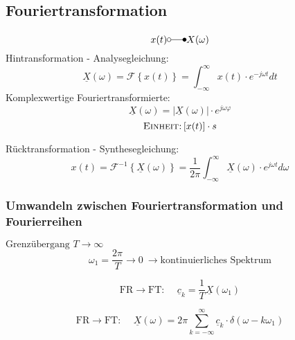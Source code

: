 \subsection{Fouriertransformation}
\begin{mdframed}[style=exercise]
    \[
        x(t) \laplace X(\omega)
    \]
    Hintransformation - Analysegleichung:
    \[
        \underline{X}(\omega)=\mathcal{F}\left\{ x(t) \right\} = \int_{-\infty}^{\infty} x(t) \cdot e^{-j\omega t} dt
    \]
    Komplexwertige Fouriertransformierte:
    \[
        \underline{X}(\omega) = |\underline{X}(\omega)|\cdot e^{j\omega\varphi}
    \]
    \footnotesize
    $$\textsc{Einheit:} \left[ x(t) \right]\cdot s$$

    \normalsize

    Rücktransformation - Synthesegleichung:
    \[
        x(t) = \mathcal{F}^{-1}\left\{ \underline{X}(\omega) \right\} = \frac{1}{2\pi}\int_{-\infty}^{\infty} \underline{X}(\omega) \cdot e^{j\omega t} d\omega
    \]
\end{mdframed}

\subsubsection{Umwandeln zwischen Fouriertransformation und Fourierreihen}
$\text{Grenzübergang\ }
    T\rightarrow\infty$
\[
    \omega_1=\frac{2\pi}{T}\rightarrow0\ \rightarrow
    \text{kontinuierliches Spektrum}
\]

\[
    \boxed{ \text{FR}\rightarrow\text{FT: }\quad \underline{c}_k =
    \frac{1}{T}\underline{X}(\omega_1)}
\]

\[
    \boxed{ \text{FR}\rightarrow\text{FT: }\quad \underline{X}(\omega) =
    2\pi\sum_{k=-\infty}^{\infty} \underline{c}_k\cdot
    \delta(\omega-k\omega_1)}
\]

